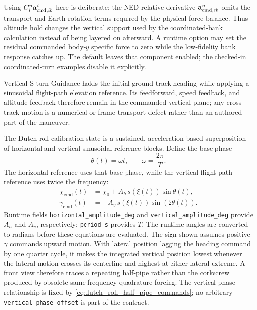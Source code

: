 Using $C_i^n\mathbf{a}_{\mathrm{cmd},ib}^{i}$ here is deliberate: the
NED-relative derivative $\mathbf{a}_{\mathrm{cmd},eb}^{n}$ omits the transport and
Earth-rotation terms required by the physical force balance.
Thus altitude hold changes the vertical support used by the coordinated-bank
calculation instead of being layered on afterward. A runtime option may set
the residual commanded body-$y$ specific force to zero while the low-fidelity
bank response catches up. The default leaves that component enabled; the
checked-in coordinated-turn examples disable it explicitly.

Vertical S-turn Guidance holds the initial ground-track heading while applying
a sinusoidal flight-path elevation reference. Its feedforward, speed feedback,
and altitude feedback therefore remain in the commanded vertical plane; any
cross-track motion is a numerical or frame-transport defect rather than an
authored part of the maneuver.

The Dutch-roll calibration state is a sustained, acceleration-based
superposition of horizontal and vertical sinusoidal reference blocks. Define the base
phase
\begin{equation}
\theta(t)=\omega t,\qquad \omega=\frac{2\pi}{T}.
\label{eq:dutch_roll_base_phase}
\end{equation}
The horizontal reference uses that base phase, while the vertical
flight-path reference uses twice the frequency:
\begin{align}
\chi_{\mathrm{cmd}}(t)
&=
\chi_0+
A_h\,s(\xi(t))\sin\theta(t),\\
\gamma_{\mathrm{cmd}}(t)
&=
-A_v\,s(\xi(t))\sin\left(2\theta(t)\right).
\label{eq:dutch_roll_half_pipe_commands}
\end{align}
Runtime fields \texttt{horizontal\_amplitude\_deg} and
\texttt{vertical\_amplitude\_deg} provide \(A_h\) and \(A_v\), respectively;
\texttt{period\_s} provides \(T\). The runtime angles are converted to radians
before these equations are evaluated. The sign
shown assumes positive \(\gamma\) commands upward motion. With lateral
position lagging the heading command by one quarter cycle, it makes the
integrated vertical position lowest whenever the lateral motion crosses its
centerline and highest at either lateral extreme. A front view therefore
traces a repeating half-pipe rather than the corkscrew produced by obsolete
same-frequency quadrature forcing. The vertical phase relationship is fixed
by \cref{eq:dutch_roll_half_pipe_commands}; no arbitrary
\texttt{vertical\_phase\_offset} is part of the contract.

